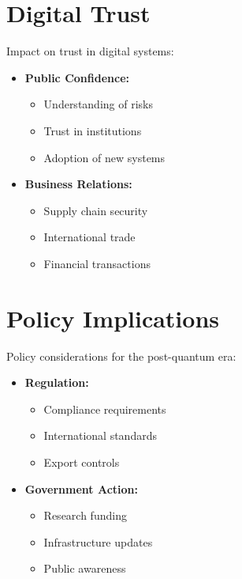 \section{Digital Trust}\label{sec:trust}

Impact on trust in digital systems:

\begin{itemize}
    \item \textbf{Public Confidence:}
    \begin{itemize}
        \item Understanding of risks
        \item Trust in institutions
        \item Adoption of new systems
    \end{itemize}
    \item \textbf{Business Relations:}
    \begin{itemize}
        \item Supply chain security
        \item International trade
        \item Financial transactions
    \end{itemize}
\end{itemize}

\section{Policy Implications}\label{sec:policy}

Policy considerations for the post-quantum era:

\begin{itemize}
    \item \textbf{Regulation:}
    \begin{itemize}
        \item Compliance requirements
        \item International standards
        \item Export controls
    \end{itemize}
    \item \textbf{Government Action:}
    \begin{itemize}
        \item Research funding
        \item Infrastructure updates
        \item Public awareness
    \end{itemize}
\end{itemize}

